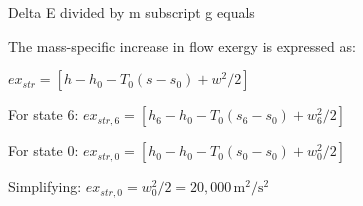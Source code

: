 Delta E divided by m subscript g equals

The mass-specific increase in flow exergy is expressed as:  

\( ex_{str} = [h - h_0 - T_0 (s - s_0) + w^2 / 2] \)  

For state 6:  
\( ex_{str,6} = [h_6 - h_0 - T_0 (s_6 - s_0) + w_6^2 / 2] \)  

For state 0:  
\( ex_{str,0} = [h_0 - h_0 - T_0 (s_0 - s_0) + w_0^2 / 2] \)  

Simplifying:  
\( ex_{str,0} = w_0^2 / 2 = 20,000 \, \text{m}^2 / \text{s}^2 \)